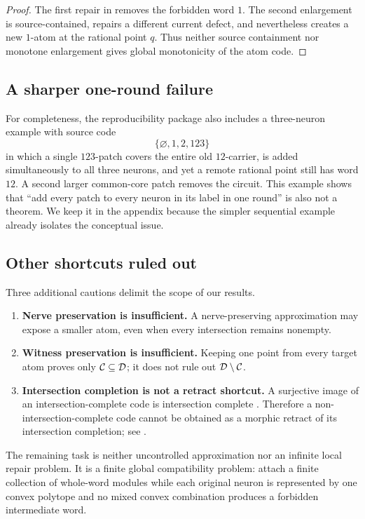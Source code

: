 \begin{proof}
The first repair in  removes the forbidden word $1$.  The second enlargement is source-contained, repairs a different current defect, and nevertheless creates a new $1$-atom at the rational point $q$.  Thus neither source containment nor monotone enlargement gives global monotonicity of the atom code.
\end{proof}

\subsection{A sharper one-round failure}

For completeness, the reproducibility package also includes a three-neuron example with source code
\[
 \{\varnothing,1,2,123\}
\]
in which a single $123$-patch covers the entire old $12$-carrier, is added simultaneously to all three neurons, and yet a remote rational point still has word $12$.  A second larger common-core patch removes the circuit.  This example shows that ``add every patch to every neuron in its label in one round'' is also not a theorem.  We keep it in the appendix because the simpler sequential example already isolates the conceptual issue.

\subsection{Other shortcuts ruled out}

Three additional cautions delimit the scope of our results.

\begin{enumerate}[label=\textup{(\roman*)}]
\item \textbf{Nerve preservation is insufficient.}  A nerve-preserving approximation may expose a smaller atom, even when every intersection remains nonempty.
\item \textbf{Witness preservation is insufficient.}  Keeping one point from every target atom proves only $\mathcal C\subseteq\mathcal D$; it does not rule out $\mathcal D\setminus\mathcal C$.
\item \textbf{Intersection completion is not a retract shortcut.}  A surjective image of an intersection-complete code is intersection complete \cite[Theorem~1.5]{Jeffs2020}.  Therefore a non-intersection-complete code cannot be obtained as a morphic retract of its intersection completion; see .
\end{enumerate}

The remaining task is neither uncontrolled approximation nor an infinite local repair problem.  It is a finite global compatibility problem: attach a finite collection of whole-word modules while each original neuron is represented by one convex polytope and no mixed convex combination produces a forbidden intermediate word.
